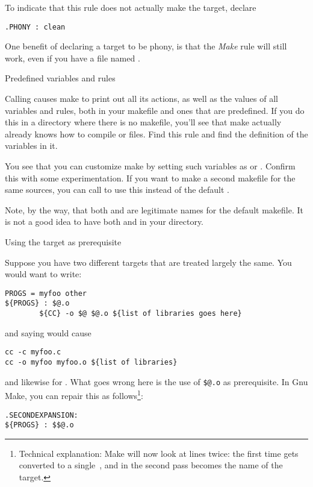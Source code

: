 To indicate that this rule does not actually make the target, declare
\begin{verbatim}
.PHONY : clean
\end{verbatim}
One benefit of declaring a target to be phony, is that the \emph{Make}
rule will still work, even if you have a file named .

 {Predefined variables and rules}

Calling  causes make to print out all its
actions, as well as the values of all variables and rules, both in
your makefile and ones that are predefined. If you do this in a
directory where there is no makefile, you'll see that make actually
already knows how to compile  or  files. Find this rule
and find the definition of the variables in it.

You see that you can customize make by setting such variables as
 or . Confirm this with some experimentation. If
you want to make a second makefile for the same sources, you can call
 to use this instead of the default
.

Note, by the way, that both  and  are
legitimate names for the default makefile. It is not a good idea to
have both  and  in your directory.

 {Using the target as prerequisite}

Suppose you have two different targets that are treated largely the
same. You would want to write:
\begin{verbatim}
PROGS = myfoo other
${PROGS} : $@.o
        ${CC} -o $@ $@.o ${list of libraries goes here}
\end{verbatim}
and saying  would cause 
\begin{verbatim}
cc -c myfoo.c
cc -o myfoo myfoo.o ${list of libraries}
\end{verbatim}
and likewise for . What goes wrong here is the use of
\verb+$@.o+ as prerequisite. In Gnu Make, you can repair this as
follows\footnote{Technical explanation: Make will now look at lines
  twice: the first time \n{\$\$} gets converted to a single~\n{\$},
  and in the second pass  becomes the name of the target.}:
\begin{verbatim}
.SECONDEXPANSION:
${PROGS} : $$@.o
\end{verbatim}


